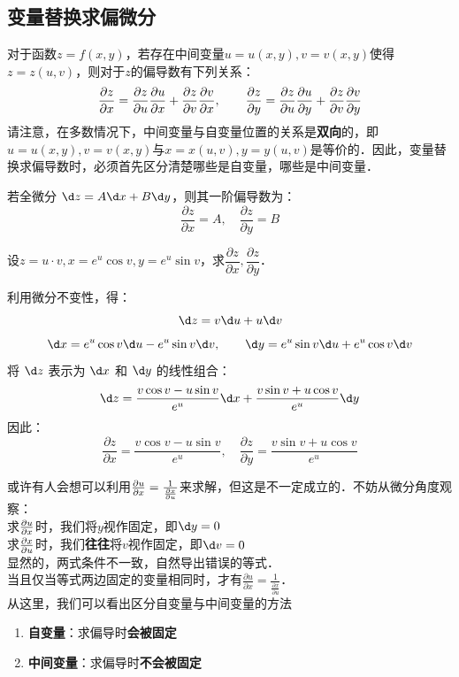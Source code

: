 \documentclass[12pt, a4paper, oneside, UTF8]{ctexbook}
\begin{document}
\subsection{变量替换求偏微分}
\begin{theorem}
    对于函数$z=f(x,y)$，若存在中间变量$u=u(x,y),v=v(x,y)$使得$z=z(u,v)$，则对于$z$的偏导数有下列关系：
    \[ \pdv{z}{x} = \pdv{z}{u} \pdv{u}{x} + \pdv{z}{v} \pdv{v}{x},\qquad \pdv{z}{y} = \pdv{z}{u} \pdv{u}{y} + \pdv{z}{v} \pdv{v}{y} \]
    请注意，在多数情况下，中间变量与自变量位置的关系是\textbf{双向}的，即$u=u(x,y),v=v(x,y)$与$x=x(u,v),y=y(u,v)$是等价的．因此，变量替换求偏导数时，必须首先区分清楚哪些是自变量，哪些是中间变量．\\
\end{theorem}
\begin{theorem}[微分不变性求一阶偏导数]
    若全微分 $\d z = A \d x + B \d y$，则其一阶偏导数为：
    \[ \frac{\partial z}{\partial x} = A, \quad \frac{\partial z}{\partial y} = B \]
\end{theorem}
\begin{example}
    设$z=u\cdot v,x=e^u\cos v,y=e^u\sin v$，求$\dfrac{\partial z}{\partial x},\dfrac{\partial z}{\partial y}$．
\end{example}
\begin{solution}
    利用微分不变性，得：
    \[ \d z = v \d u + u \d v \]
    \[\d x = e^u \cos v \d u - e^u \sin v \d v,\qquad\d y = e^u \sin v \d u + e^u \cos v \d v\]
    将 $\d z$ 表示为 $\d x$ 和 $\d y$ 的线性组合：
    \[\d z = \frac{v \cos v - u \sin v}{e^u} \d x + \frac{v \sin v + u \cos v}{e^u} \d y\]
    因此：
    \[ \boxed{\frac{\partial z}{\partial x} = \frac{v \cos v - u \sin v}{e^u}, \quad \frac{\partial z}{\partial y} = \frac{v \sin v + u \cos v}{e^u}} \]
\end{solution}
\begin{myRemark}
    或许有人会想可以利用$\pdv{u}{x}=\frac{1}{\pdv{x}{u}}$来求解，但这是不一定成立的．不妨从微分角度观察：\\
    求$\pdv{u}{x}$时，我们将$y$视作固定，即$\d y=0$\\
    求$\pdv{x}{u}$时，我们\textbf{往往}将$v$视作固定，即$\d v=0$\\
    显然的，两式条件不一致，自然导出错误的等式．\\
    当且仅当等式两边固定的变量相同时，才有$\frac{\partial u}{\partial x}=\frac{1}{\frac{\partial x}{\partial u}}$．\\
    从这里，我们可以看出区分自变量与中间变量的方法
    \begin{enumerate}
        \item \textbf{自变量}：求偏导时\textbf{会被固定}
        \item \textbf{中间变量}：求偏导时\textbf{不会被固定}
    \end{enumerate}
\end{myRemark}
\end{document}
